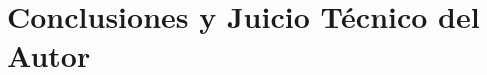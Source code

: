 \documentclass{report}
\begin{document}
%

\chapter{Conclusiones y Juicio Técnico del Autor}
\end{document}
